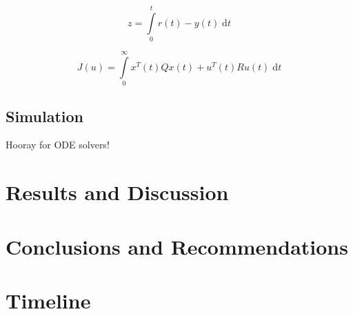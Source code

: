 \documentclass{sydeStyle}
\begin{document}
\begin{equation}
    z = \int\limits_0^t r(t) - y(t) \; \textrm{d}t
    \label{eqn:z}
\end{equation}

\begin{equation}
    J(u) = \int\limits_0^\infty x^T(t)Qx(t) + u^T(t)Ru(t) \; \textrm{d}t
    \label{eqn:cost}
\end{equation}

\section{Simulation}
Hooray for ODE solvers!

\chapter{Results and Discussion}

\chapter{Conclusions and Recommendations}

\chapter{Timeline}
\end{document}
